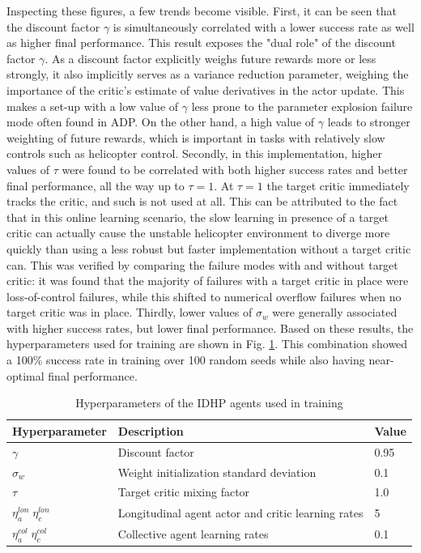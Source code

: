Inspecting these figures, a few trends become visible. First, it can be seen that the discount factor $\gamma$ is simultaneously correlated with a lower success rate as well as higher final performance. This result exposes the "dual role" of the discount factor $\gamma$. As a discount factor explicitly weighs future rewards more or less strongly, it also implicitly serves as a variance reduction parameter, weighing the importance of the critic's estimate of value derivatives in the actor update. This makes a set-up with a low value of $\gamma$ less prone to the parameter explosion failure mode often found in ADP. On the other hand, a high value of $\gamma$ leads to stronger weighting of future rewards, which is important in tasks with relatively slow controls such as helicopter control. 
Secondly, in this implementation, higher values of $\tau$ were found to be correlated with both higher success rates and better final performance, all the way up to $\tau=1$. At $\tau=1$ the target critic immediately tracks the critic, and such is not used at all. This can be attributed to the fact that in this online learning scenario, the slow learning in presence of a target critic can actually cause the unstable helicopter environment to diverge more quickly than using a less robust but faster implementation without a target critic can. This was verified by comparing the failure modes with and without target critic: it was found that the majority of failures with a target critic in place were loss-of-control failures, while this shifted to numerical overflow failures when no target critic was in place. 
Thirdly, lower values of $\sigma_w$ were generally associated with higher success rates, but lower final performance. Based on these results, the hyperparameters used for training are shown in Fig. \ref{tab:training_end_hyperparams}. This combination showed a 100\% success rate in training over 100 random seeds while also having near-optimal final performance. 

\begin{table}[ht!]
\centering
\caption{Hyperparameters of the IDHP agents used in training}
\label{tab:training_end_hyperparams}
\begin{tabular}{@{}lll@{}}
\toprule
Hyperparameter               & Description                                 & Value \\ \midrule
$\gamma$                     & Discount factor                             & 0.95   \\
$\sigma_w$                   & Weight initialization standard deviation & 0.1   \\
$\tau$                       & Target critic mixing factor                 & 1.0  \\
$\eta^{lon}_{a} \; \eta^{lon}_c$ & Longitudinal agent actor and critic learning rates           & 5     \\
$\eta^{col}_{a} \; \eta^{col}_c $ & Collective agent learning rates             & 0.1   \\ \bottomrule
\end{tabular}
\end{table}

